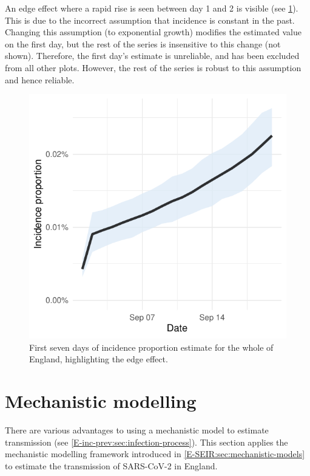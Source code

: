 \documentclass[thesis.tex]{subfiles}
\begin{document}
An edge effect where a rapid rise is seen between day 1 and 2 is visible (see \cref{transmission:fig:backcalc-start-effect}).
This is due to the incorrect assumption that incidence is constant in the past.
Changing this assumption (\eg to exponential growth) modifies the estimated value on the first day, but the rest of the series is insensitive to this change (not shown).
Therefore, the first day's estimate is unreliable, and has been excluded from all other plots.
However, the rest of the series is robust to this assumption and hence reliable.
\begin{figure}
    \centering \includegraphics{transmission/backcalc-start-effect}
    \caption[Edge effects in backcalculation method]{%
        First seven days of incidence proportion estimate for the whole of England, highlighting the edge effect.
    }
    \label{transmission:fig:backcalc-start-effect}
\end{figure}

\section{Mechanistic modelling} \label{SEIR}

There are various advantages to using a mechanistic model to estimate transmission (see \cref{E-inc-prev:sec:infection-process}).
This section applies the mechanistic modelling framework introduced in \cref{E-SEIR:sec:mechanistic-models} to estimate the transmission of SARS-CoV-2 in England.
\end{document}
